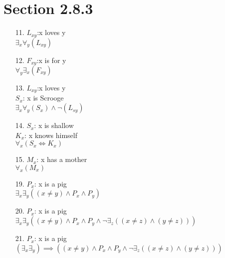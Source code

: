 \documentclass{article}
\begin{document}
	\section{Section 2.8.3}
	\begin{enumerate}
		\item[11.]
			$L_{xy}$:x loves y\\
			$\exists _x \forall _y (L_{xy})$\\
		\item[12.]
			$F_{xy}$:x is for y\\
			$\forall _y \exists _x (F_{xy})$\\
		\item[13.]
			$L_{xy}$:x loves y\\
			$S_x$: x is Scrooge\\
			$\exists _x \forall _y (S_x) \land \lnot (L_{sy})$\\
		\item[14.]
			$S_x$: x is shallow\\
			$K_x$: x knows himself\\
			$\forall _x (S_x \iff K_x)$\\
		\item[15.]
			$M_x$: x has a mother\\
			$\forall _x (M_x)$\\
		\item[19.]
			$P_x$: x is a pig\\
			$\exists _x \exists _y ((x \neq y)\land P_x \land P_y)$\\
		\item[20.]
			$P_x$: x is a pig\\
			$\exists _x \exists _y ((x \neq y) \land P_x \land P_y \land \lnot \exists _z ((x \neq z) \land (y \neq z)))$\\
		\item[21.]
			$P_x$: x is a pig\\
			$(\exists _x \exists _y) \implies ((x \neq y) \land P_x \land P_y \land \lnot \exists _z ((x \neq z) \land (y \neq z)))$\\
	\end{enumerate}
\end{document}
